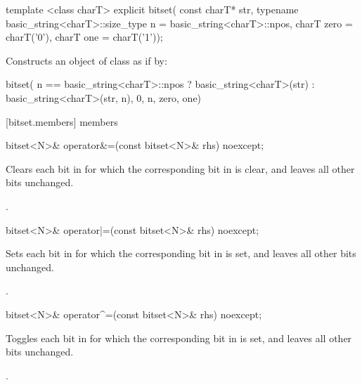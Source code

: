 %
\begin{itemdecl}
template <class charT>
  explicit bitset(
    const charT* str,
    typename basic_string<charT>::size_type n = basic_string<charT>::npos,
    charT zero = charT('0'), charT one = charT('1'));
\end{itemdecl}

\begin{itemdescr}
\pnum
\effects Constructs an object of class  as if by:
\begin{codeblock}
bitset(
  n == basic_string<charT>::npos
    ? basic_string<charT>(str)
    : basic_string<charT>(str, n),
  0, n, zero, one)
\end{codeblock}

\end{itemdescr}


[bitset.members]{ members}

%
\begin{itemdecl}
bitset<N>& operator&=(const bitset<N>& rhs) noexcept;
\end{itemdecl}

\begin{itemdescr}
\pnum
\effects
Clears each bit in
for which the corresponding bit in  is clear, and leaves all other bits unchanged.

\pnum
\returns
{}.
\end{itemdescr}

%
\begin{itemdecl}
bitset<N>& operator|=(const bitset<N>& rhs) noexcept;
\end{itemdecl}

\begin{itemdescr}
\pnum
\effects
Sets each bit in
for which the corresponding bit in  is set, and leaves all other bits unchanged.

\pnum
\returns
{}.
\end{itemdescr}

%
\begin{itemdecl}
bitset<N>& operator^=(const bitset<N>& rhs) noexcept;
\end{itemdecl}

\begin{itemdescr}
\pnum
\effects
Toggles each bit in
for which the corresponding bit in  is set, and leaves all other bits unchanged.

\pnum
\returns
{}.
\end{itemdescr}

